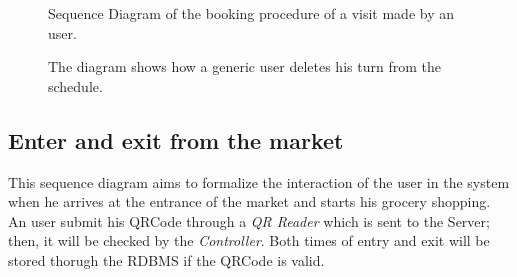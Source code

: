 \begin{figure}[H]
  \label{VisitSD}
  \centering
    \caption{Sequence Diagram of the booking procedure of a visit made by an user.}
\end{figure} 




\begin{figure}[H]
  \label{DeleteVisitSD}
  \centering
    \caption{The diagram shows how a generic user deletes his turn from the schedule.}
\end{figure} 


\subsection{Enter and exit from the market}
This sequence diagram aims to formalize the interaction of the user in the system when he arrives at the entrance of the market and starts his grocery shopping.
An user submit his QRCode through a \textit{QR Reader} which is sent to the Server; then, it will be checked by the \textit{Controller}. Both times of entry and exit will be stored thorugh the RDBMS if the QRCode is valid.

